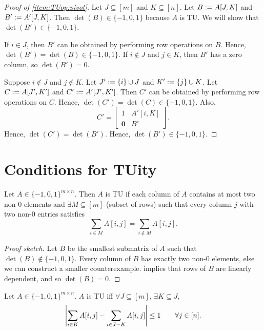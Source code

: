 \documentclass[a4paper,12pt,fleqn]{article}
\begin{document}
\begin{proof}[Proof of \ref{item:TUop:pivot}]
Let $J \subseteq [m]$ and $K \subseteq [n]$. Let $B := A[J, K]$ and $B' := A'[J, K]$.
Then $\det(B) \in \{-1, 0, 1\}$ because $A$ is TU. We will show that $\det(B') \in \{-1, 0, 1\}$.

If $i \in J$, then $B'$ can be obtained by performing row operations on $B$.
Hence, $\det(B') = \det(B) \in \{-1, 0, 1\}$.
If $i \not\in J$ and $j \in K$, then $B'$ has a zero column, so $\det(B') = 0$.

Suppose $i \not\in J$ and $j \not\in K$.
Let $J' := \{i\} \cup J$ and $K' := \{j\} \cup K$.
Let $C := A[J', K']$ and $C' := A'[J', K']$.
Then $C'$ can be obtained by performing row operations on $C$.
Hence, $\det(C') = \det(C) \in \{-1, 0, 1\}$. Also,
\[ C' = \begin{bmatrix}1 & A'[i, K] \\ \textbf{0} & B'\end{bmatrix}. \]
Hence, $\det(C') = \det(B')$. Hence, $\det(B') \in \{-1, 0, 1\}$.
\end{proof}

\section{Conditions for TUity}

\begin{lemma}
\label{thm:tu-2-part}
Let $A \in \{-1, 0, 1\}^{m \times n}$. Then $A$ is TU if
each column of $A$ contains at most two non-0 elements
and $\exists M \subseteq [m]$ (subset of rows) such that
every column $j$ with two non-0 entries satisfies
\begin{equation}
\label{eqn:partition-sum}
\sum_{i \in M} A[i,j] = \sum_{i \not\in M} A[i,j].
\end{equation}
\end{lemma}
\begin{proof}[Proof sketch]
Let $B$ be the smallest submatrix of $A$ such that $\det(B) \not\in \{-1, 0, 1\}$.
Every column of $B$ has exactly two non-0 elements,
else we can construct a smaller counterexample.
 implies that rows of $B$
are linearly dependent, and so $\det(B) = 0$.
\end{proof}

\begin{lemma}[Characterization]
\label{thm:tu-char}
Let $A \in \{-1, 0, 1\}^{m \times n}$. $A$ is TU iff
$\forall J \subseteq [m]$, $\exists K \subseteq J$,
\[ \left\lvert \sum_{i \in K} A[i,j] - \sum_{i \in J-K} A[i,j] \right\rvert \le 1 \qquad \forall j \in [n]. \]
\end{lemma}
\end{document}
